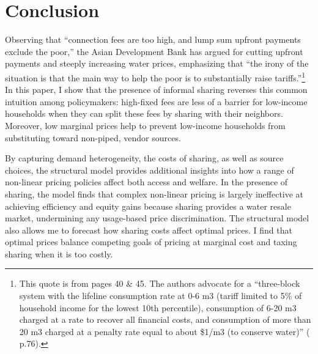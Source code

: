 \documentclass[12pt]{article}
\begin{document}
\section{Conclusion}\label{section:conclusion}


Observing that ``connection fees are too high, and lump sum upfront payments exclude the poor,'' the Asian Development Bank has argued for cutting upfront payments and steeply increasing water prices, emphasizing that ``the irony of the situation is that the main way to help the poor is to substantially raise tariffs.''\footnote{This quote is from \cite{mcintosh2003asian} pages 40 \& 45.  The authors advocate for a ``three-block system with the lifeline consumption rate at 0-6 m3 (tariff limited to 5\% of household income for the lowest 10th percentile), consumption of 6-20 m3 charged at a rate to recover all financial costs, and consumption of more than 20 m3 charged at a penalty rate equal to about \$1/m3 (to conserve water)'' (\cite{mcintosh2003asian} p.76).}  In this paper, I show that the presence of informal sharing reverses this common intuition among policymakers: high-fixed fees are less of a barrier for low-income households when they can split these fees by sharing with their neighbors.  Moreover, low marginal prices help to prevent low-income households from substituting toward non-piped, vendor sources.  

By capturing demand heterogeneity, the costs of sharing, as well as source choices, the structural model provides additional insights into how a range of non-linear pricing policies affect both access and welfare.  In the presence of sharing, the model finds that complex non-linear pricing is largely ineffective at achieving efficiency and equity gains because sharing provides a water resale market, undermining any usage-based price discrimination.  The structural model also allows me to forecast how sharing costs affect optimal prices.  I find that optimal prices balance competing goals of pricing at marginal cost and taxing sharing when it is too costly.
\end{document}
